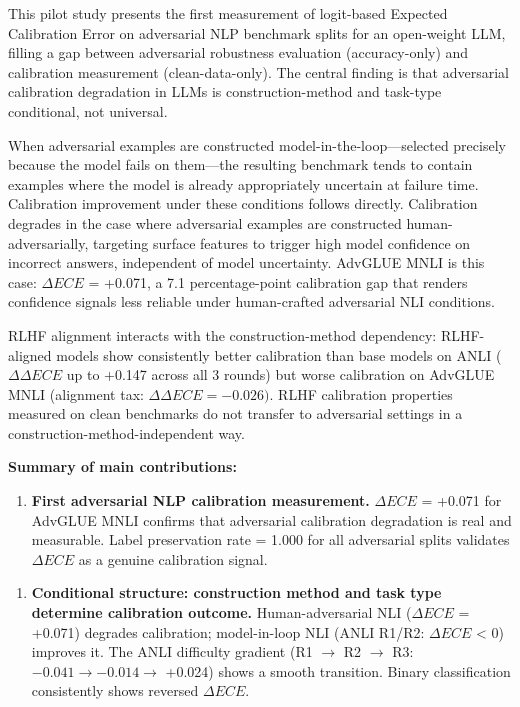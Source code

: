 
This pilot study presents the first measurement of logit-based Expected Calibration Error on adversarial NLP benchmark splits for an open-weight LLM, filling a gap between adversarial robustness evaluation (accuracy-only) and calibration measurement (clean-data-only). The central finding is that adversarial calibration degradation in LLMs is construction-method and task-type conditional, not universal.

When adversarial examples are constructed model-in-the-loop---selected precisely because the model fails on them---the resulting benchmark tends to contain examples where the model is already appropriately uncertain at failure time. Calibration improvement under these conditions follows directly. Calibration degrades in the case where adversarial examples are constructed human-adversarially, targeting surface features to trigger high model confidence on incorrect answers, independent of model uncertainty. AdvGLUE MNLI is this case: $\Delta ECE$ = +0.071, a 7.1 percentage-point calibration gap that renders confidence signals less reliable under human-crafted adversarial NLI conditions.

RLHF alignment interacts with the construction-method dependency: RLHF-aligned models show consistently better calibration than base models on ANLI ($\Delta \Delta ECE$ up to +0.147 across all 3 rounds) but worse calibration on AdvGLUE MNLI (alignment tax: $\Delta \Delta ECE = -0.026)$. RLHF calibration properties measured on clean benchmarks do not transfer to adversarial settings in a construction-method-independent way.

\textbf{Summary of main contributions:}

\begin{enumerate}
\item \textbf{First adversarial NLP calibration measurement.} $\Delta ECE$ = +0.071 for AdvGLUE MNLI confirms that adversarial calibration degradation is real and measurable. Label preservation rate = 1.000 for all adversarial splits validates $\Delta ECE$ as a genuine calibration signal.
\end{enumerate}

\begin{enumerate}
\item \textbf{Conditional structure: construction method and task type determine calibration outcome.} Human-adversarial NLI ($\Delta ECE$ = +0.071) degrades calibration; model-in-loop NLI (ANLI R1/R2: $\Delta ECE$ < 0) improves it. The ANLI difficulty gradient (R1 $\rightarrow$ R2 $\rightarrow$ R3: $-0.041 \rightarrow -0.014 \rightarrow$ +0.024) shows a smooth transition. Binary classification consistently shows reversed $\Delta ECE$.
\end{enumerate}

